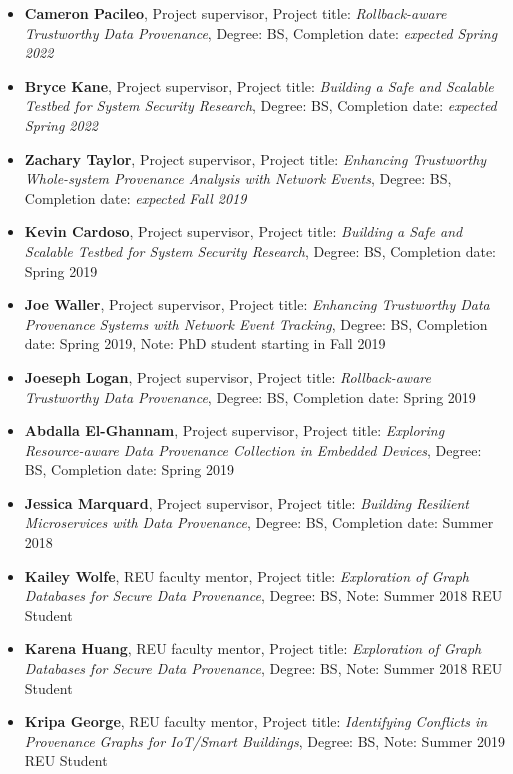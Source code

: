 \begin{itemize}
\tightlist
\item \textbf{Cameron Pacileo}, Project supervisor, Project title: \textit{Rollback-aware Trustworthy Data Provenance}, Degree: BS, Completion date: \textit{expected Spring 2022}
\item \textbf{Bryce Kane}, Project supervisor, Project title: \textit{Building a Safe and Scalable Testbed for System Security Research}, Degree: BS, Completion date: \textit{expected Spring 2022}
\item \textbf{Zachary Taylor}, Project supervisor, Project title: \textit{Enhancing Trustworthy Whole-system Provenance Analysis with Network Events}, Degree: BS, Completion date: \textit{expected Fall 2019}
\item \textbf{Kevin Cardoso}, Project supervisor, Project title: \textit{Building a Safe and Scalable Testbed for System Security Research}, Degree: BS, Completion date: Spring 2019
\item \textbf{Joe Waller}, Project supervisor, Project title: \textit{Enhancing Trustworthy Data Provenance Systems with Network Event Tracking}, Degree: BS, Completion date: Spring 2019, Note: PhD student starting in Fall 2019
\item \textbf{Joeseph Logan}, Project supervisor, Project title: \textit{Rollback-aware Trustworthy Data Provenance}, Degree: BS, Completion date: Spring 2019
\item \textbf{Abdalla El-Ghannam}, Project supervisor, Project title: \textit{Exploring Resource-aware Data Provenance Collection in Embedded Devices}, Degree: BS, Completion date: Spring 2019
\item \textbf{Jessica Marquard}, Project supervisor, Project title: \textit{Building Resilient Microservices with Data Provenance}, Degree: BS, Completion date: Summer 2018
\item \textbf{Kailey Wolfe}, REU faculty mentor, Project title: \textit{Exploration of Graph Databases for Secure Data Provenance}, Degree: BS, Note: Summer 2018 REU Student
\item \textbf{Karena Huang}, REU faculty mentor, Project title: \textit{Exploration of Graph Databases for Secure Data Provenance}, Degree: BS, Note: Summer 2018 REU Student
\item \textbf{Kripa George}, REU faculty mentor, Project title: \textit{Identifying Conflicts in Provenance Graphs for IoT/Smart Buildings}, Degree: BS, Note: Summer 2019 REU Student
\end{itemize}
